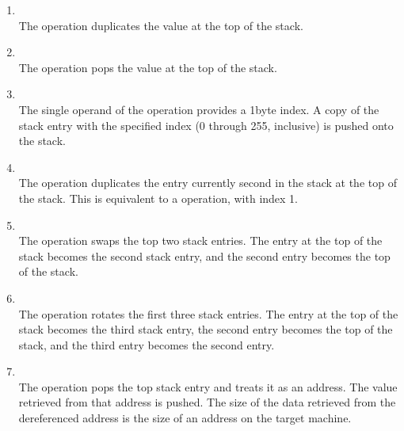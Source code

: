 \begin{enumerate}[1]
\item {} \\
The  operation duplicates the value at the top of the stack.

\item {} \\
The  operation pops the value at the top of the stack.

\item {} \\
The single operand of the  operation provides a
1\dash byte index. A copy of the stack entry with the specified
index (0 through 255, inclusive) is pushed onto the stack.

\item {} \\
The  operation duplicates the entry currently second
in the stack at the top of the stack. 
This is equivalent to
a  operation, with index 1.  

\item {} \\
The  operation swaps the top two stack entries. 
The entry at the top of the
stack becomes the second stack entry, 
and the second entry becomes the top of the stack.

\item {} \\
The  operation rotates the first three stack
entries. The entry at the top of the stack becomes the third
stack entry, the second entry becomes the top of the stack,
and the third entry becomes the second entry.

\item  {} \\
The  operation pops the top stack entry and 
treats it as an address. The value
retrieved from that address is pushed. 
The size of the data retrieved from the dereferenced
address is the size of an address on the target machine.


\end{enumerate}
